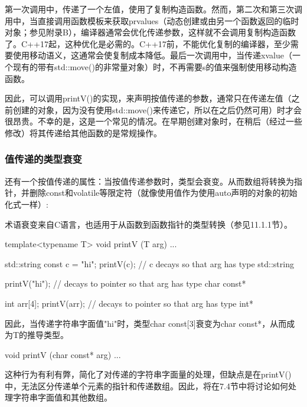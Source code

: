第一次调用中，传递了一个左值，使用了复制构造函数。然而，第二次和第三次调用中，当直接调用函数模板来获取prvalues（动态创建或由另一个函数返回的临时对象；参见附录B），编译器通常会优化传递参数，这样就不会调用复制构造函数了。C++17起，这种优化是必需的。C++17前，不能优化复制的编译器，至少需要使用移动语义，这通常会使复制成本降低。最后一次调用中，当传递xvalue（一个现有的带有std::move()的非常量对象）时，不再需要s的值来强制使用移动构造函数。

因此，可以调用printV()的实现，来声明按值传递的参数，通常只在传递左值（之前创建的对象，因为没有使用std::move()来传递它，所以在之后仍然可用）时才会很昂贵。不幸的是，这是一个常见的情况。在早期创建对象时，在稍后（经过一些修改）将其传递给其他函数的是常规操作。

\subsubsection{值传递的类型衰变}

还有一个按值传递的属性：当按值传递参数时，类型会衰变。从而数组将转换为指针，并删除const和volatile等限定符（就像使用值作为使用auto声明的对象的初始化式一样）:

\begin{notice}
术语衰变来自C语言，也适用于从函数到函数指针的类型转换（参见11.1.1节）。
\end{notice}

\begin{cpp}
template<typename T>
void printV (T arg) {
	...
}

std::string const c = "hi";
printV(c); // c decays so that arg has type std::string

printV("hi"); // decays to pointer so that arg has type char const*

int arr[4];
printV(arr); // decays to pointer so that arg has type int*
\end{cpp}

因此，当传递字符串字面值"hi"时，类型char const[3]衰变为char const*，从而成为T的推导类型。

\begin{cpp}
void printV (char const* arg) {
	...
}
\end{cpp}

这种行为有利有弊，简化了对传递的字符串字面量的处理，但缺点是在printV()中，无法区分传递单个元素的指针和传递数组。因此，将在7.4节中将讨论如何处理字符串字面值和其他数组。




